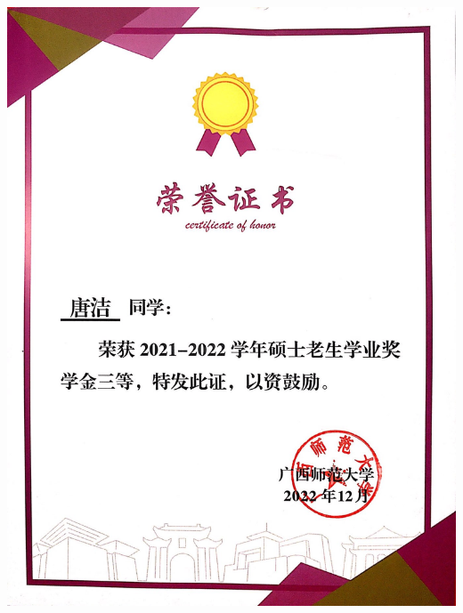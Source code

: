 \documentclass[UFT8]{ctexart}%
\begin{document}
\begin{center}
 \includegraphics[scale=0.15]{figs/2022-12.jpg }
\end{center}

\end{document}

